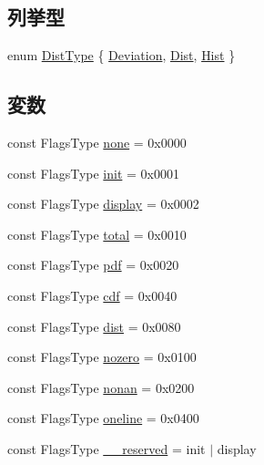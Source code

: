 \subsection*{列挙型}
\begin{DoxyCompactItemize}
\item 
enum \hyperlink{namespaceStats_a1d00be67865ecfaa5774f566d76a6876}{DistType} \{ \hyperlink{namespaceStats_a1d00be67865ecfaa5774f566d76a6876a9c7a78ae450635ef56b14d9ac5714672}{Deviation}, 
\hyperlink{namespaceStats_a1d00be67865ecfaa5774f566d76a6876adafb9a616d02d2905c1e83984012b298}{Dist}, 
\hyperlink{namespaceStats_a1d00be67865ecfaa5774f566d76a6876af89f9b7b8883a8af366c466ae76274f4}{Hist}
 \}
\end{DoxyCompactItemize}
\subsection*{変数}
\begin{DoxyCompactItemize}
\item 
const FlagsType \hyperlink{namespaceStats_adaca029bee6973514c46aa649f669b21}{none} = 0x0000
\item 
const FlagsType \hyperlink{namespaceStats_aa1f55d332b4c8393735b7f1d87098beb}{init} = 0x0001
\item 
const FlagsType \hyperlink{namespaceStats_a4f0406c9859ba486a98825d53a233056}{display} = 0x0002
\item 
const FlagsType \hyperlink{namespaceStats_a4031dfee086a6a4cf1deea1fff2e0d5c}{total} = 0x0010
\item 
const FlagsType \hyperlink{namespaceStats_a148700bbb7b09b1ebb9d6b099155391a}{pdf} = 0x0020
\item 
const FlagsType \hyperlink{namespaceStats_af659db47be37cf4f7fee0a18e320843b}{cdf} = 0x0040
\item 
const FlagsType \hyperlink{namespaceStats_a25cf6f3e458aaa5fdf87fc287ef0376e}{dist} = 0x0080
\item 
const FlagsType \hyperlink{namespaceStats_aea66fede55fadabd06c458fb36736378}{nozero} = 0x0100
\item 
const FlagsType \hyperlink{namespaceStats_a8e574059d445838aa4d851c263cb0e78}{nonan} = 0x0200
\item 
const FlagsType \hyperlink{namespaceStats_a924518f4adce022c20ffa8ae5540e6d4}{oneline} = 0x0400
\item 
const FlagsType \hyperlink{namespaceStats_a18e4982df9983fc1af85ce62a8020c52}{\_\-\_\-reserved} = init $|$ display
\end{DoxyCompactItemize}
